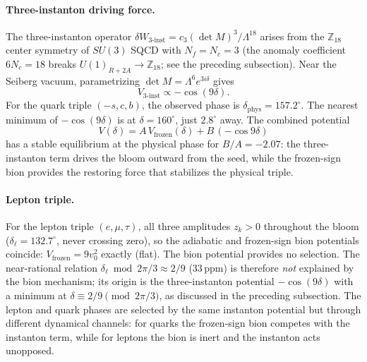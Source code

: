 \paragraph{Three-instanton driving force.}
The three-instanton operator
$\delta W_{3\text{-inst}} = c_3(\det M)^3/\Lambda^{18}$
arises from the $\mathbb{Z}_{18}$ center symmetry of $SU(3)$ SQCD
with $N_f = N_c = 3$ (the anomaly coefficient $6N_c = 18$
breaks $U(1)_{R+2A} \to \mathbb{Z}_{18}$; see the preceding subsection).
Near the Seiberg vacuum, parametrizing
$\det M = \Lambda^6 e^{3i\delta}$ gives
\begin{equation*}
  V_{3\text{-inst}} \propto -\cos(9\delta).
\end{equation*}
For the quark triple $(-s,c,b)$, the observed phase is
$\delta_{\mathrm{phys}} = 157.2^\circ$.
The nearest minimum of $-\cos(9\delta)$ is at $\delta = 160^\circ$,
just $2.8^\circ$ away.
The combined potential
\begin{equation*}
  V(\delta) = A\,V_{\mathrm{frozen}}(\delta) + B\,(-\cos 9\delta)
\end{equation*}
has a stable equilibrium at the physical phase for
$B/A = -2.07$: the three-instanton term drives the bloom outward
from the seed, while the frozen-sign bion provides the restoring
force that stabilizes the physical triple.

\paragraph{Lepton triple.}
For the lepton triple $(e,\mu,\tau)$, all three amplitudes
$z_k > 0$ throughout the bloom ($\delta_\ell = 132.7^\circ$,
never crossing zero), so the adiabatic and frozen-sign bion potentials
coincide: $V_{\mathrm{frozen}} = 9v_0^2$ exactly (flat).
The bion potential provides no selection.
The near-rational relation $\delta_\ell \bmod 2\pi/3 \approx 2/9$
($33\,\mathrm{ppm}$) is therefore \emph{not} explained by the
bion mechanism; its origin is the three-instanton potential
$-\cos(9\delta)$ with a minimum at $\delta \equiv 2/9 \pmod{2\pi/3}$,
as discussed in the preceding subsection.
The lepton and quark phases are selected by the same instanton
potential but through different dynamical channels:
for quarks the frozen-sign bion competes with the instanton term,
while for leptons the bion is inert and the instanton acts unopposed.
